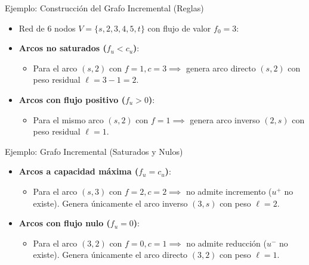 \documentclass[
  ignorenonframetext,
]{beamer}
\providecommand{\tightlist}{%
  \setlength{\itemsep}{0pt}\setlength{\parskip}{0pt}}
\begin{document}
\begin{frame}{Ejemplo: Construcción del Grafo Incremental (Reglas)}
\label{ejemplo-construcciuxf3n-del-grafo-incremental-reglas}
\begin{itemize}
\item
  Red de 6 nodos \(V = \{s, 2, 3, 4, 5, t\}\) con flujo de valor
  \(f_0 = 3\):
\item
  \textbf{Arcos no saturados (\(f_u < c_u\))}:

  \begin{itemize}
  \tightlist
  \item
    Para el arco \((s,2)\) con \(f=1, c=3 \implies\) genera arco directo
    \((s,2)\) con peso residual \(\ell = 3 - 1 = 2\).
  \end{itemize}
\item
  \textbf{Arcos con flujo positivo (\(f_u > 0\))}:

  \begin{itemize}
  \tightlist
  \item
    Para el mismo arco \((s,2)\) con \(f=1 \implies\) genera arco
    inverso \((2,s)\) con peso residual \(\ell = 1\).
  \end{itemize}
\end{itemize}
\end{frame}

\begin{frame}{Ejemplo: Grafo Incremental (Saturados y Nulos)}
\label{ejemplo-grafo-incremental-saturados-y-nulos}
\begin{itemize}
\tightlist
\item
  \textbf{Arcos a capacidad máxima (\(f_u = c_u\))}:

  \begin{itemize}
  \tightlist
  \item
    Para el arco \((s,3)\) con \(f=2, c=2 \implies\) no admite
    incremento (\(u^+\) no existe). Genera únicamente el arco inverso
    \((3,s)\) con peso \(\ell = 2\).
  \end{itemize}
\item
  \textbf{Arcos con flujo nulo (\(f_u = 0\))}:

  \begin{itemize}
  \tightlist
  \item
    Para el arco \((3,2)\) con \(f=0, c=1 \implies\) no admite reducción
    (\(u^-\) no existe). Genera únicamente el arco directo \((3,2)\) con
    peso \(\ell = 1\).
  \end{itemize}
\end{itemize}
\end{frame}
\end{document}
